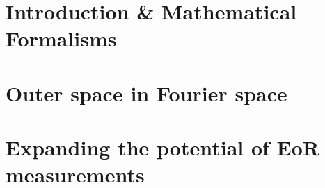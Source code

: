 \documentclass[12pt,twoside,openany]{book}
\begin{document}
\part{Introduction \& Mathematical Formalisms}
%
%
%
%
%
%
%
%

%
%
\part{Outer space in Fourier space}

%
%
%

%
%

%
%

% 
%

%
%

%
%

%
%
\part{Expanding the potential of EoR measurements}




%
%


%

\newpage
%



\end{document}
